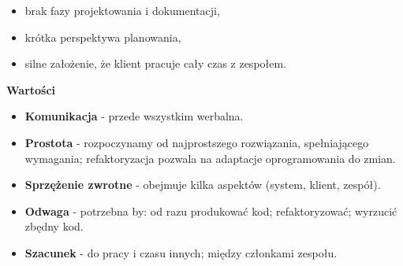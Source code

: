 \documentclass[a4paper]{article}
\begin{document}
    \begin{itemize}
        \item brak fazy projektowania i dokumentacji,
        \item krótka perspektywa planowania,
        \item silne założenie, że klient pracuje cały czas z zespołem.
    \end{itemize}

    \textbf{Wartości}
    \begin{itemize}
        \item \textbf{Komunikacja} - przede wszystkim werbalna.
        \item \textbf{Prostota} - rozpoczynamy od najprostszego rozwiązania, spełniającego
        wymagania; refaktoryzacja pozwala na adaptacje oprogramowania do zmian.
        \item \textbf{Sprzężenie zwrotne} - obejmuje kilka aspektów (system, klient, zespół).
        \item \textbf{Odwaga} - potrzebna by: od razu produkować kod; refaktoryzować; wyrzucić zbędny kod.
        \item \textbf{Szacunek} - do pracy i czasu innych; między członkami zespołu.
    \end{itemize}
\end{document}
